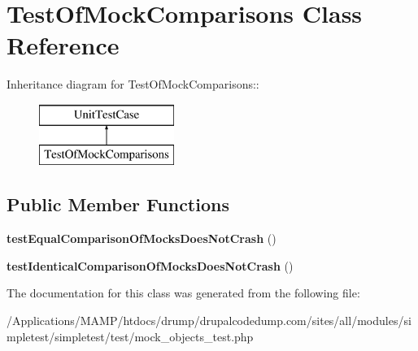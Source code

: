 \hypertarget{class_test_of_mock_comparisons}{
\section{TestOfMockComparisons Class Reference}
\label{class_test_of_mock_comparisons}
}
Inheritance diagram for TestOfMockComparisons::\begin{figure}[H]
\begin{center}
\leavevmode
\includegraphics[height=2cm]{class_test_of_mock_comparisons}
\end{center}
\end{figure}
\subsection*{Public Member Functions}
\begin{DoxyCompactItemize}
\item 
\hypertarget{class_test_of_mock_comparisons_ab5ad5fa1537da9bb68a20cc8a134f967}{
{\bfseries testEqualComparisonOfMocksDoesNotCrash} ()}
\label{class_test_of_mock_comparisons_ab5ad5fa1537da9bb68a20cc8a134f967}

\item 
\hypertarget{class_test_of_mock_comparisons_ac1c823013bc670f8d79c225c0ae3e2b5}{
{\bfseries testIdenticalComparisonOfMocksDoesNotCrash} ()}
\label{class_test_of_mock_comparisons_ac1c823013bc670f8d79c225c0ae3e2b5}

\end{DoxyCompactItemize}


The documentation for this class was generated from the following file:\begin{DoxyCompactItemize}
\item 
/Applications/MAMP/htdocs/drump/drupalcodedump.com/sites/all/modules/simpletest/simpletest/test/mock\_\-objects\_\-test.php\end{DoxyCompactItemize}
